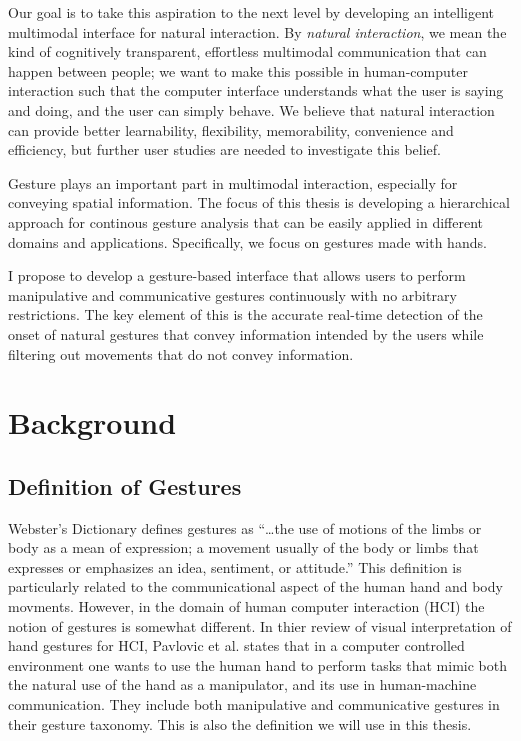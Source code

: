 Our goal is to take this aspiration to the next level by developing an
intelligent multimodal interface for natural interaction. By \textit{natural
interaction}, we mean the kind of cognitively transparent, effortless multimodal
communication that can happen between people; we want to make this possible in
human-computer interaction such that the computer interface understands what the
user is saying and doing, and the user can simply behave. We believe that
natural interaction can provide better learnability, flexibility, memorability,
convenience and efficiency, but further user studies are needed to investigate
this belief.

Gesture plays an important part in multimodal interaction, especially for
conveying spatial information. The focus of this thesis is developing a
hierarchical approach for continous gesture analysis that can be easily
applied in different domains and applications. Specifically, we focus on
gestures made with hands. 

I propose to develop a gesture-based interface that allows users to perform
manipulative and communicative gestures continuously with no arbitrary
restrictions. The key element of this is the accurate real-time
detection of the onset of natural gestures that convey information intended by the users while filtering
out movements that do not convey information. 

\section{Background}
\subsection{Definition of Gestures}
Webster's Dictionary defines gestures as ``\ldots the use of motions of the
limbs or body as a mean of expression; a movement usually of the body or limbs
that expresses or emphasizes an idea, sentiment, or attitude.'' This definition
is particularly related to the communicational aspect of the human hand and body
movments. However, in the domain of human computer interaction (HCI) the notion
of gestures is somewhat different. In thier review of visual interpretation of hand
gestures for HCI, Pavlovic et al. \cite{Pavlovic97} states that in a computer
controlled environment one wants to use the human hand to perform tasks that
mimic both the natural use of the hand as a manipulator, and its use in
human-machine communication. They include both manipulative and communicative
gestures in their gesture taxonomy. This is also the definition we will use in
this thesis.

